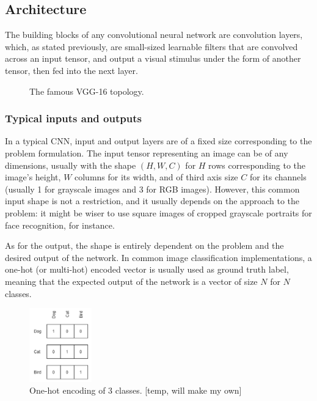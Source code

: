 \subsection{Architecture}

The building blocks of any convolutional neural network are convolution layers,
which, as stated previously, are small-sized learnable filters that are
convolved across an input tensor, and output a visual stimulus under the form of
another tensor, then fed into the next layer.

\begin{figure}[h]
	\center
	\resizebox{480pt}{!}{
		
	}
	\caption{The famous VGG-16 topology.}
	\label{fig:vgg16}
\end{figure}

	\subsubsection{Typical inputs and outputs}
In a typical CNN, input and output layers are of a fixed size corresponding to
the problem formulation. The input tensor representing an image can be of any
dimensions, usually with the shape $(H, W, C)$ for $H$ rows corresponding to the
image's height, $W$ columns for its width, and of third axis size $C$ for its
channels (usually 1 for grayscale images and 3 for RGB images). However, this
common input shape is not a restriction, and it usually depends on the approach
to the problem: it might be wiser to use square images of cropped grayscale
portraits for face recognition, for instance.\\


As for the output, the shape is entirely dependent on the problem and the
desired output of the network. In common image classification implementations,
a one-hot (or multi-hot) encoded vector is usually used as ground truth label,
meaning that the expected output of the network is a vector of size $N$ for $N$
classes.

\begin{figure}
	\begin{center}
		\includegraphics[width=0.24\textwidth]{figure/one_hot.png}
	\end{center}
	\label{fig:onehot}
	\caption{One-hot encoding of 3 classes. [temp, will make my own]}
\end{figure}


